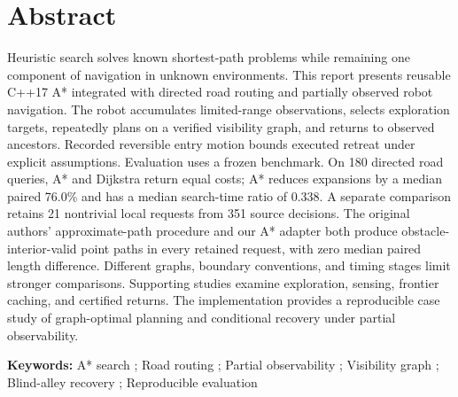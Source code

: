 \section*{Abstract}
Heuristic search solves known shortest-path problems while remaining one component of navigation in unknown environments. This report presents reusable C++17 A* integrated with directed road routing and partially observed robot navigation. The robot accumulates limited-range observations, selects exploration targets, repeatedly plans on a verified visibility graph, and returns to observed ancestors. Recorded reversible entry motion bounds executed retreat under explicit assumptions. Evaluation uses a frozen benchmark. On 180 directed road queries, A* and Dijkstra return equal costs; A* reduces expansions by a median paired 76.0\% and has a median search-time ratio of 0.338. A separate comparison retains 21 nontrivial local requests from 351 source decisions. The original authors' approximate-path procedure and our A* adapter both produce obstacle-interior-valid point paths in every retained request, with zero median paired length difference. Different graphs, boundary conventions, and timing stages limit stronger comparisons. Supporting studies examine exploration, sensing, frontier caching, and certified returns. The implementation provides a reproducible case study of graph-optimal planning and conditional recovery under partial observability.

\noindent\textbf{Keywords:} A* search ; Road routing ; Partial observability ; Visibility graph ; Blind-alley recovery ; Reproducible evaluation
